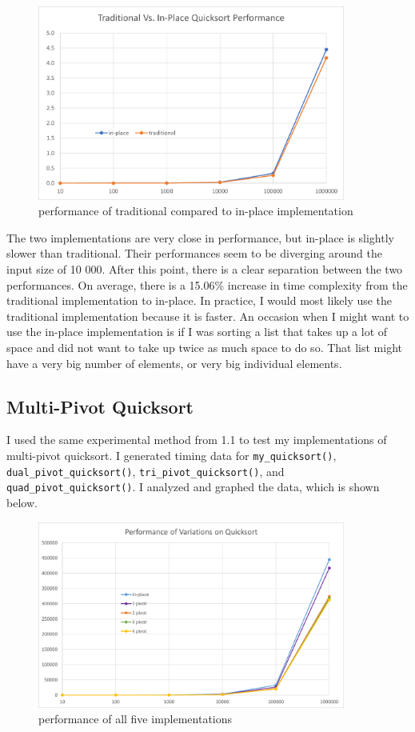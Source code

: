 \documentclass[12pt]{article}
\begin{document}
\begin{figure}[H]
\centering
\includegraphics[width=0.9\textwidth,height=\textheight,keepaspectratio]{in_place}
\caption{performance of traditional compared to in-place implementation}
\label{Figure: i1}
\end{figure}
\noindent The two implementations are very close in performance, but in-place is slightly slower than traditional. Their performances seem to be diverging around the input size of 10 000. After this point, there is a clear separation between the two performances. On average, there is a 15.06\% increase in time complexity from the traditional implementation to in-place.
In practice, I would most likely use the traditional implementation because it is faster. An occasion when I might want to use the in-place implementation is if I was sorting a list that takes up a lot of space and did not want to take up twice as much space to do so. That list might have a very big number of elements, or very big individual elements. 

\subsection{Multi-Pivot Quicksort}
I used the same experimental method from 1.1 to test my implementations of multi-pivot quicksort. I generated timing data for \verb+my_quicksort()+, \verb+dual_pivot_quicksort()+, \verb+tri_pivot_quicksort()+, and \verb+quad_pivot_quicksort()+. I analyzed and graphed the data, which is shown below.

\begin{figure}[H]
\centering
\includegraphics[width=0.9\textwidth,height=\textheight,keepaspectratio]{multi_pivot}
\caption{performance of all five implementations}
\label{Figure: m1}
\end{figure}
\end{document}
